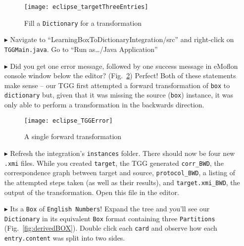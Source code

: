 \begin{itemize}
\vspace{0.5cm}

\begin{figure}[htbp]
\begin{center}
  \texttt{[image: eclipse\_targetThreeEntries]}
  \caption{Fill a \texttt{Dictionary} for a transformation}
  \label{fig:dictionaryxmi}
\end{center}
\end{figure}

\item[$\blacktriangleright$] Navigate to ``LearningBox\-To\-Dictionary\-In\-te\-gra\-tion\-/src'' and right-click on \texttt{TGGMain.java}. Go to ``Run
as\ldots/Java Application''

\vspace{0.5cm}

\item[$\blacktriangleright$] Did you get one error message, followed by one success message in eMoflon console window below the editor?
(Fig.~\ref{fig:tggERROR}) Perfect! Both of these statements make sense -- our TGG first attempted a forward transformation of \texttt{box} to
\texttt{dictionary} but, given that it was missing the source (\texttt{box}) instance, it was only able to perform a transformation in the backwards direction.

\begin{figure}[htbp]
\begin{center}
  \texttt{[image: eclipse\_TGGError]}
  \caption{A single forward transformation}
  \label{fig:tggERROR}
\end{center}
\end{figure}

\newpage

\item[$\blacktriangleright$] Refresh the integration's \texttt{instances} folder. There should now be four new \texttt{.xmi} files. While you created
\texttt{target}, the TGG generated \texttt{corr\_BWD}, the correspondence graph between target and source, \texttt{protocol\_BWD}, a listing of the attempted
steps taken (as well as their results), and \texttt{target.xmi\_BWD}, the output of the transformation. Open this file in the editor.

\item[$\blacktriangleright$] Its a \texttt{Box} of \texttt{English Numbers}! Expand the tree and you'll see our \texttt{Dictionary} in its equivalent
\texttt{Box} format containing three \texttt{Par\-ti\-tions} (Fig.~\ref{fig:derivedBOX}). Double click each \texttt{card} and observe how each
\texttt{entry.content} was split into two sides.


\end{itemize}
